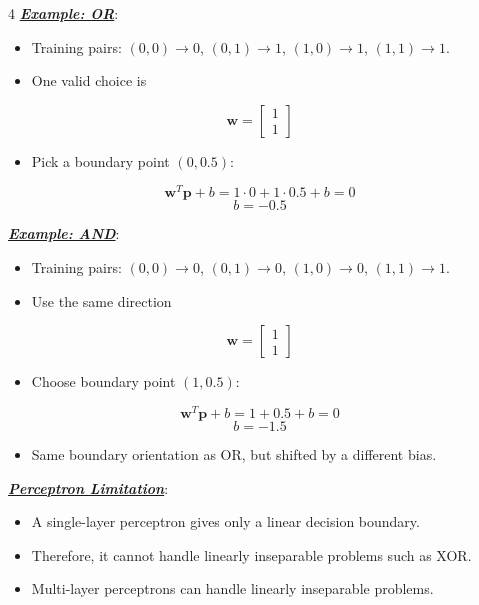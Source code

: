 \documentclass[12pt]{article}
\newcommand{\bulletPoint}[1]{\ul{\textit{\textbf{#1}}}}
\begin{document}
\begin{multicols*}{4}
\bulletPoint{Example: OR}:
\begin{itemize}
\item Training pairs: $(0,0)\to 0$, $(0,1)\to 1$, $(1,0)\to 1$, $(1,1)\to 1$.
\item One valid choice is
\end{itemize}
\useshortskip
\begin{equation*}
    \mathbf{w}=\begin{bmatrix}1\\1\end{bmatrix}
\end{equation*}
\begin{itemize}
\item Pick a boundary point $(0,0.5)$:
\end{itemize}
\useshortskip
\begin{equation*}
    \mathbf{w}^T\mathbf{p}+b=1\cdot 0+1\cdot 0.5+b=0
\end{equation*}
\useshortskip
\begin{equation*}
    b=-0.5
\end{equation*}

\bulletPoint{Example: AND}:
\begin{itemize}
\item Training pairs: $(0,0)\to 0$, $(0,1)\to 0$, $(1,0)\to 0$, $(1,1)\to 1$.
\item Use the same direction
\end{itemize}
\useshortskip
\begin{equation*}
    \mathbf{w}=\begin{bmatrix}1\\1\end{bmatrix}
\end{equation*}
\begin{itemize}
\item Choose boundary point $(1,0.5)$:
\end{itemize}
\useshortskip
\begin{equation*}
    \mathbf{w}^T\mathbf{p}+b=1+0.5+b=0
\end{equation*}
\useshortskip
\begin{equation*}
    b=-1.5
\end{equation*}
\begin{itemize}
\item Same boundary orientation as OR, but shifted by a different bias.
\end{itemize}

\bulletPoint{Perceptron Limitation}:
\begin{itemize}
\item A single-layer perceptron gives only a linear decision boundary.
\item Therefore, it cannot handle linearly inseparable problems such as XOR.
\item Multi-layer perceptrons can handle linearly inseparable problems.
\end{itemize}


\end{multicols*}
\end{document}
